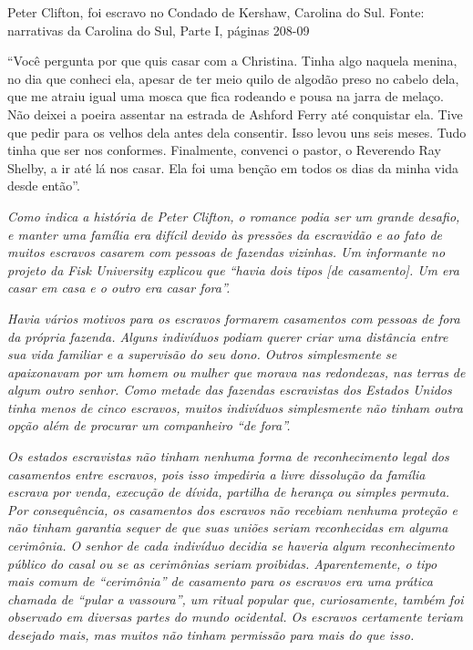 Peter Clifton, foi escravo no Condado de Kershaw, Carolina do Sul.
Fonte: narrativas da Carolina do Sul, Parte I, páginas 208-09

``Você pergunta por que quis casar com a Christina. Tinha algo naquela
menina, no dia que conheci ela, apesar de ter meio quilo de algodão
preso no cabelo dela, que me atraiu igual uma mosca que fica rodeando e
pousa na jarra de melaço. Não deixei a poeira assentar na estrada de
Ashford Ferry até conquistar ela. Tive que pedir para os velhos dela
antes dela consentir. Isso levou uns seis meses. Tudo tinha que ser nos
conformes. Finalmente, convenci o pastor, o Reverendo Ray Shelby, a ir
até lá nos casar. Ela foi uma benção em todos os dias da minha vida
desde então''.

\emph{Como indica a história de Peter Clifton, o romance podia ser um
grande desafio, e manter uma família era difícil devido às pressões da
escravidão e ao fato de muitos escravos casarem com pessoas de fazendas
vizinhas. Um informante no projeto da Fisk University explicou que
``havia dois tipos {[}de casamento{]}. Um era casar em casa e o outro
era casar fora''. }

\emph{Havia vários motivos para os escravos formarem casamentos com
pessoas de fora da própria fazenda. Alguns indivíduos podiam querer
criar uma distância entre sua vida familiar e a supervisão do seu dono.
Outros simplesmente se apaixonavam por um homem ou mulher que morava nas
redondezas, nas terras de algum outro senhor. Como metade das fazendas
escravistas dos Estados Unidos tinha menos de cinco escravos, muitos
indivíduos simplesmente não tinham outra opção além de procurar um
companheiro ``de fora''. }

\emph{Os estados escravistas não tinham nenhuma forma de reconhecimento
legal dos casamentos entre escravos, pois isso impediria a livre
dissolução da família escrava por venda, execução de dívida, partilha de
herança ou simples permuta. Por consequência, os casamentos dos escravos
não recebiam nenhuma proteção e não tinham garantia sequer de que suas
uniões seriam reconhecidas em alguma cerimônia. O senhor de cada
indivíduo decidia se haveria algum reconhecimento público do casal ou se
as cerimônias seriam proibidas. Aparentemente, o tipo mais comum de
``cerimônia'' de casamento para os escravos era uma prática chamada de
``pular a vassoura'', um ritual popular que, curiosamente, também foi
observado em diversas partes do mundo ocidental. Os escravos certamente
teriam desejado mais, mas muitos não tinham permissão para mais do que
isso.}

